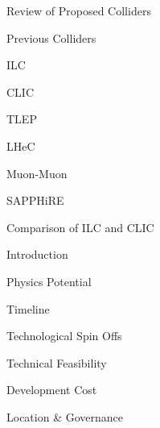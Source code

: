 \documentclass[12pt]{article}
\begin{document}
 \begin{section}{Review of Proposed Colliders}
 
     \begin{subsection}{Previous Colliders}
             
     \end{subsection}
     \begin{subsection}{ILC}
         
     \end{subsection}
     \begin{subsection}{CLIC}
         
     \end{subsection}
     \begin{subsection}{TLEP}
         
     \end{subsection}
     \begin{subsection}{LHeC}
         
     \end{subsection}
     \begin{subsection}{Muon-Muon}
         
     \end{subsection}
     \begin{subsection}{SAPPHiRE}
             
     \end{subsection}
     
 \end{section}
 
 \begin{section}{Comparison of ILC and CLIC}
 
     \begin{subsection}{Introduction}
         
     \end{subsection}
     
     \begin{subsection}{Physics Potential}
         
     \end{subsection}     
     
     \begin{subsection}{Timeline}
         
     \end{subsection}
          
     \begin{subsection}{Technological Spin Offs}
                                   
     \end{subsection}
     
     \begin{subsection}{Technical Feasibility}
         
     \end{subsection}

    \begin{subsection}{Development Cost}
        
    \end{subsection}

    \begin{subsection}{Location \& Governance}
        
    \end{subsection}
     
 \end{section}
 
\end{document}

